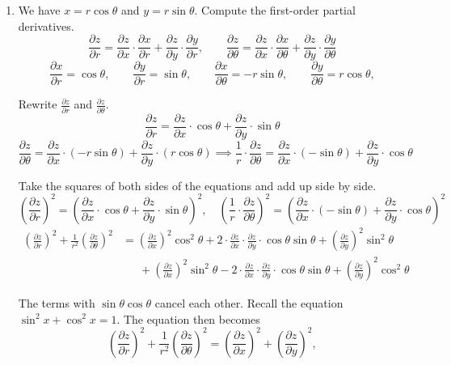 \documentclass[a4paper, 12pt]{article}
\begin{document}
\begin{enumerate}[leftmargin=*,label=\textbf{\arabic*.}]
\newpage

\item We have $x=r\cos\theta$ and $y=r\sin\theta$. Compute the first-order partial derivatives.
\[\frac{\partial z}{\partial r}=\frac{\partial z}{\partial x}\cdot\frac{\partial x}{\partial r}+\frac{\partial z}{\partial y}\cdot\frac{\partial y}{\partial r},\qquad\frac{\partial z}{\partial \theta}=\frac{\partial z}{\partial x}\cdot\frac{\partial x}{\partial \theta}+\frac{\partial z}{\partial y}\cdot\frac{\partial y}{\partial \theta}\]
\[\frac{\partial x}{\partial r}=\cos\theta,\qquad\frac{\partial y}{\partial r}=\sin\theta,\qquad\frac{\partial x}{\partial \theta}=-r\sin\theta,\qquad\frac{\partial y}{\partial\theta}=r\cos\theta,\]

Rewrite $\displaystyle\frac{\partial z}{\partial r}$ and $\displaystyle\frac{\partial z}{\partial\theta}$.
\[\frac{\partial z}{\partial r}=\frac{\partial z}{\partial x}\cdot\cos\theta+\frac{\partial z}{\partial y}\cdot\sin\theta\]
\[\frac{\partial z}{\partial\theta}=\frac{\partial z}{\partial x}\cdot(-r\sin\theta)+\frac{\partial z}{\partial y}\cdot(r\cos\theta)\implies\frac1r\cdot\frac{\partial z}{\partial\theta}=\frac{\partial z}{\partial x}\cdot(-\sin\theta)+\frac{\partial z}{\partial y}\cdot\cos\theta\]

Take the squares of both sides of the equations and add up side by side.
\[\left(\frac{\partial z}{\partial r}\right)^2=\left(\frac{\partial z}{\partial x}\cdot\cos\theta+\frac{\partial z}{\partial y}\cdot\sin\theta\right)^2,\quad\left(\frac1r\cdot\frac{\partial z}{\partial\theta}\right)^2=\left(\frac{\partial z}{\partial x}\cdot(-\sin\theta)+\frac{\partial z}{\partial y}\cdot\cos\theta\right)^2\]
\begin{align*}
\left(\frac{\partial z}{\partial r}\right)^2+\frac1{r^2}\left(\frac{\partial z}{\partial\theta}\right)^2&=\left(\frac{\partial z}{\partial x}\right)^2\cos^2\theta+2\cdot\frac{\partial z}{\partial x}\cdot\frac{\partial z}{\partial y}\cdot\cos\theta\sin\theta+\left(\frac{\partial z}{\partial y}\right)^2\sin^2\theta\\[1em]&\quad\:\;+\left(\frac{\partial z}{\partial x}\right)^2\sin^2\theta-2\cdot\frac{\partial z}{\partial x}\cdot\frac{\partial z}{\partial y}\cdot\cos\theta\sin\theta+\left(\frac{\partial z}{\partial y}\right)^2\cos^2\theta
\end{align*}

The terms with $\sin\theta\cos\theta$ cancel each other. Recall the equation $\displaystyle \sin^2x+\cos^2x=1$. The equation then becomes
\[\left(\frac{\partial z}{\partial r}\right)^2+\frac1{r^2}\left(\frac{\partial z}{\partial\theta}\right)^2=\left(\frac{\partial z}{\partial x}\right)^2+\left(\frac{\partial z}{\partial y}\right)^2,\]


\end{enumerate}
\end{document}
